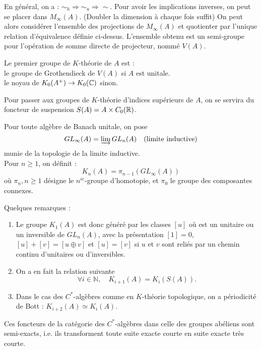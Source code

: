 En général, on a : $\sim_h \Rightarrow \sim_u \Rightarrow \sim$. Pour avoir les implications inverses, on peut se placer dans $M_\infty(A)$. (Doubler la dimension à chaque fois suffit) On peut alors considérer l'ensemble des projections de $M_\infty (A)$ et quotienter par l'unique relation d'équivalence définie ci-dessus. L'ensemble obtenu est un semi-groupe pour l'opération de somme directe de projecteur, nommé $V(A)$.\\

\begin{definition}
Le premier groupe de $K$-théorie de $A$ est :\\
le groupe de Grothendieck de $V(A)$ si $A$ est unitale.\\
le noyau de $K_0(A^+)\rightarrow K_0(\mathbb C)$ sinon.
\end{definition}

Pour passer aux groupes de $K$-théorie d'indices supérieurs de $A$, on se servira du foncteur de suspension $S(A)=A\times C_0(\mathbb R)$.

\begin{definition}
Pour toute algèbre de Banach unitale, on pose \[GL_\infty(A) = \varinjlim GL_n(A) \quad \text{(limite inductive)}\]
munie de la topologie de la limite inductive.\\
Pour $n\geq 1$, on définit :
\[K_n(A)=\pi_{n-1}\left(GL_\infty (A)\right)\] 
où $\pi_n, n\geq 1$ désigne le $n^{ie}$-groupe d'homotopie, et $\pi_0$ le groupe des composantes connexes.
\end{definition}

Quelques remarques : 
\begin{enumerate}
\item Le groupe $K_1(A)$ est donc généré par les classes $[u]$ où est un unitaire ou un inversible de $GL_n(A)$, avec la présentation $[1]=0$, $[u]+[v]=[u\oplus v]$ et $[u]=[v]$ si $u$ et $v$ sont reliés par un chemin continu d'unitaires ou d'inversibles.
\item On a en fait la relation suivante \[\forall i\in \mathbb N, \quad K_{i+1}(A)=K_i(S(A)).\]
\item Dans le cas des $C^*$-algèbres comme en $K$-théorie topologique, on a périodicité de Bott : $K_{i+2}(A)\simeq K_i(A)$.\\
\end{enumerate}

 Ces foncteurs de la catégorie des $C^*$-algèbres dans celle des groupes abéliens sont semi-exacts, i.e. ils transforment toute suite exacte courte en suite exacte très courte.

